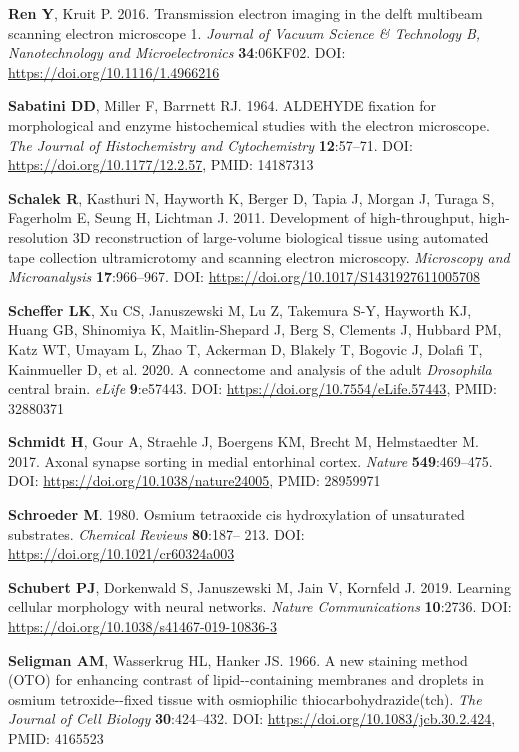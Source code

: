 \documentclass{article}
\newenvironment{reflist}{\par\small\setlength{\parindent}{0pt}\everypar{\hangindent=2.2em\hangafter=1}}{\par}
\begin{document}
\begin{reflist}
\textbf{Ren Y}, Kruit P. 2016. Transmission electron imaging in the delft multibeam scanning electron microscope 1. \emph{Journal of Vacuum Science \& Technology B, Nanotechnology and Microelectronics} \textbf{34}:06KF02. DOI: \url{https://doi.org/10.1116/1.4966216}

\textbf{Sabatini DD}, Miller F, Barrnett RJ. 1964. ALDEHYDE fixation for morphological and enzyme histochemical studies with the electron microscope. \emph{The Journal of Histochemistry and Cytochemistry} \textbf{12}:57–71. DOI: \url{https://doi.org/10.1177/12.2.57}, PMID: 14187313

\textbf{Schalek R}, Kasthuri N, Hayworth K, Berger D, Tapia J, Morgan J, Turaga S, Fagerholm E, Seung H, Lichtman J. 2011. Development of high-throughput, high-resolution 3D reconstruction of large-volume biological tissue using automated tape collection ultramicrotomy and scanning electron microscopy. \emph{Microscopy and Microanalysis} \textbf{17}:966–967. DOI: \url{https://doi.org/10.1017/S1431927611005708}

\textbf{Scheffer LK}, Xu CS, Januszewski M, Lu Z, Takemura S-Y, Hayworth KJ, Huang GB, Shinomiya K, Maitlin-Shepard J, Berg S, Clements J, Hubbard PM, Katz WT, Umayam L, Zhao T, Ackerman D, Blakely T, Bogovic J, Dolafi T, Kainmueller D, et al. 2020. A connectome and analysis of the adult \emph{Drosophila} central brain. \emph{eLife} \textbf{9}:e57443. DOI: \url{https://doi.org/10.7554/eLife.57443}, PMID: 32880371

\textbf{Schmidt H}, Gour A, Straehle J, Boergens KM, Brecht M, Helmstaedter M. 2017. Axonal synapse sorting in medial entorhinal cortex. \emph{Nature} \textbf{549}:469–475. DOI: \url{https://doi.org/10.1038/nature24005}, PMID: 28959971

\textbf{Schroeder M}. 1980. Osmium tetraoxide cis hydroxylation of unsaturated substrates. \emph{Chemical Reviews} \textbf{80}:187– 213. DOI: \url{https://doi.org/10.1021/cr60324a003}

\textbf{Schubert PJ}, Dorkenwald S, Januszewski M, Jain V, Kornfeld J. 2019. Learning cellular morphology with neural networks. \emph{Nature Communications} \textbf{10}:2736. DOI: \url{https://doi.org/10.1038/s41467-019-10836-3}

\textbf{Seligman AM}, Wasserkrug HL, Hanker JS. 1966. A new staining method (OTO) for enhancing contrast of lipid-{}-containing membranes and droplets in osmium tetroxide-{}-fixed tissue with osmiophilic thiocarbohydrazide(tch). \emph{The Journal of Cell Biology} \textbf{30}:424–432. DOI: \url{https://doi.org/10.1083/jcb.30.2.424}, PMID: 4165523


\end{reflist}
\end{document}
